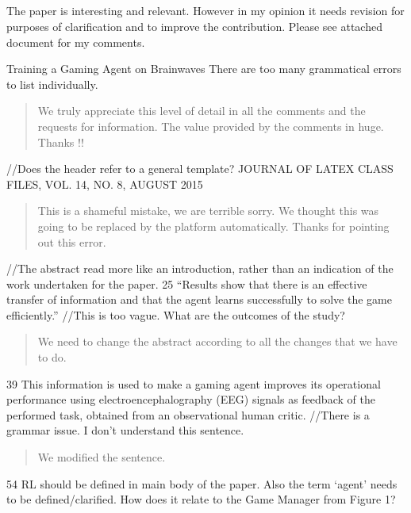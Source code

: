 \documentclass[journal,onecolumn,12pt]{IEEEtran}
\begin{document}
\subsection*{}
The paper is interesting and relevant. However in my opinion it needs revision for purposes of clarification and to improve the contribution.
Please see attached document for my comments.

Training a Gaming Agent on Brainwaves
There are too many grammatical errors to list individually.

\begin{quotation}
{\color{blue}
We truly appreciate this level of detail in all the comments and the requests for information.  The value provided by the comments in huge.  Thanks !!
}
\end{quotation}


//Does the header refer to a general template?
JOURNAL OF LATEX CLASS FILES, VOL. 14, NO. 8, AUGUST 2015

\begin{quotation}
{\color{blue}
This is a shameful mistake, we are terrible sorry.  We thought this was going to be replaced by the platform automatically. Thanks for pointing out this error.
}
\end{quotation}

//The abstract read more like an introduction, rather than an indication of the work undertaken for the paper.
25 “Results show that there is an effective transfer of information and that
the agent learns successfully to solve the game efficiently.”
//This is too vague. What are the outcomes of the study?

\begin{quotation}
{\color{blue}
We need to change the abstract according to all the changes that we have to do.
}
\end{quotation}

39 This information is used to make a gaming agent improves its operational performance using electroencephalography (EEG) signals as feedback of the performed task, obtained from an observational human critic.
//There is a grammar issue. I don’t understand this sentence.

\begin{quotation}
{\color{blue}
We modified the sentence.
}
\end{quotation}

54 RL should be defined in main body of the paper. Also the term ‘agent’ needs to be defined/clarified. How does it relate to the Game Manager from Figure 1?
\end{document}

